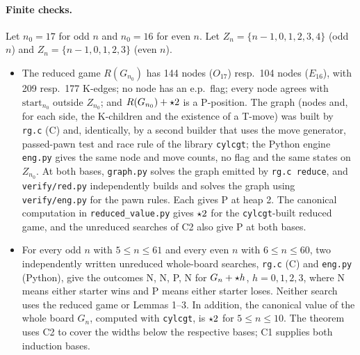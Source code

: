\begin{wallproof}
\paragraph{Finite checks.} Let $n_0=17$ for odd $n$ and $n_0=16$ for even $n$. Let $Z_n=\{n-1,0,1,2,3,4\}$ (odd $n$) and
$Z_n=\{n-1,0,1,2,3\}$ (even $n$).
\begin{itemize}
\item[\textbf{C1}]  The reduced game $R(G_{n_0})$ has 144 nodes ($O_{17}$) resp.\ 104 nodes ($E_{16}$), with 209 resp.\ 177
K-edges; no node has an e.p.\ flag; every node agrees with $\mathrm{start}_{n_0}$ outside $Z_{n_0}$; and $R(G_{n_0})+\mathord{\star2}$ is a
P-position. The graph (nodes and, for each side, the K-children and the existence of a T-move) was built by \texttt{rg.c} (C) and,
identically, by a second builder that uses the move generator, passed-pawn test and race rule of the library \texttt{cylcgt}; the
Python engine \texttt{eng.py} gives the same node and move counts, no flag and the same states on $Z_{n_0}$. At both bases, \texttt{graph.py} solves the graph emitted by \texttt{rg.c reduce}, and \texttt{verify/red.py} independently builds and solves the graph using \texttt{verify/eng.py} for the pawn rules. Each gives P at heap 2. The canonical computation in \texttt{reduced\_value.py} gives $\mathord{\star2}$ for the \texttt{cylcgt}-built reduced game, and the unreduced searches of C2 also give P at both bases.
\item[\textbf{C2}]  For every odd $n$ with $5\le n\le61$ and every even $n$ with $6\le n\le60$, two independently written
unreduced whole-board searches, \texttt{rg.c} (C) and \texttt{eng.py} (Python), give the outcomes N, N, P, N for $G_n+\mathord{\star h}$,
$h=0,1,2,3$, where N means either starter wins and P means either starter loses. Neither search uses the reduced game or Lemmas 1--3. In addition, the canonical value of the whole
board $G_n$, computed with \texttt{cylcgt}, is $\mathord{\star2}$ for $5\le n\le10$. The theorem uses C2 to cover the widths below the respective bases; C1 supplies both induction bases.
\end{itemize}


\end{wallproof}
